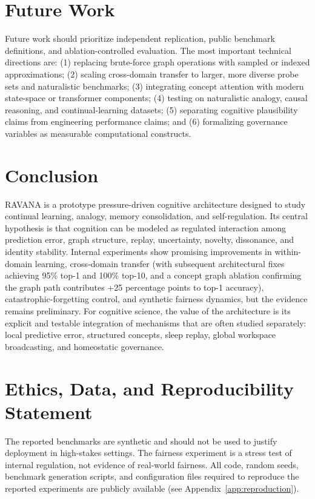 \documentclass[11pt]{article}
\begin{document}
\section{Future Work}
Future work should prioritize independent replication, public benchmark definitions, and ablation-controlled evaluation. The most important technical directions are: (1) replacing brute-force graph operations with sampled or indexed approximations; (2) scaling cross-domain transfer to larger, more diverse probe sets and naturalistic benchmarks; (3) integrating concept attention with modern state-space or transformer components; (4) testing on naturalistic analogy, causal reasoning, and continual-learning datasets; (5) separating cognitive plausibility claims from engineering performance claims; and (6) formalizing governance variables as measurable computational constructs.

\section{Conclusion}
RAVANA is a prototype pressure-driven cognitive architecture designed to study continual learning, analogy, memory consolidation, and self-regulation. Its central hypothesis is that cognition can be modeled as regulated interaction among prediction error, graph structure, replay, uncertainty, novelty, dissonance, and identity stability. Internal experiments show promising improvements in within-domain learning, cross-domain transfer (with subsequent architectural fixes achieving 95\% top-1 and 100\% top-10, and a concept graph ablation confirming the graph path contributes +25 percentage points to top-1 accuracy), catastrophic-forgetting control, and synthetic fairness dynamics, but the evidence remains preliminary. For cognitive science, the value of the architecture is its explicit and testable integration of mechanisms that are often studied separately: local predictive error, structured concepts, sleep replay, global workspace broadcasting, and homeostatic governance.

\section*{Ethics, Data, and Reproducibility Statement}
The reported benchmarks are synthetic and should not be used to justify deployment in high-stakes settings. The fairness experiment is a stress test of internal regulation, not evidence of real-world fairness. All code, random seeds, benchmark generation scripts, and configuration files required to reproduce the reported experiments are publicly available (see Appendix~\ref{app:reproduction}).
\end{document}
